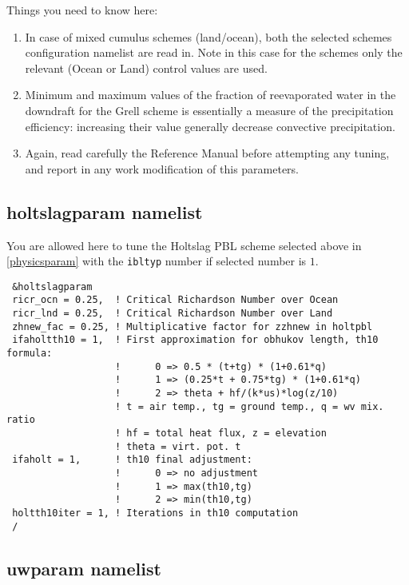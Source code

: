 Things you need to know here:

\begin{enumerate}
\item In case of mixed cumulus schemes (land/ocean), both the selected
schemes configuration namelist are read in.  Note in this case for the
schemes only the relevant (Ocean or Land) control values are used.
\item Minimum and maximum values of the fraction of reevaporated water in the
downdraft for the Grell scheme is essentially a measure of the precipitation
efficiency: increasing their value generally decrease convective precipitation.
\item Again, read carefully the Reference Manual before attempting any tuning,
and report in any work modification of this parameters.
\end{enumerate}

\subsection{holtslagparam namelist}

You are allowed here to tune the Holtslag PBL scheme selected above in
\ref{physicsparam} with the \verb=ibltyp= number if selected number is
$1$. 

{\footnotesize
\begin{Verbatim}
 &holtslagparam
 ricr_ocn = 0.25,  ! Critical Richardson Number over Ocean
 ricr_lnd = 0.25,  ! Critical Richardson Number over Land
 zhnew_fac = 0.25, ! Multiplicative factor for zzhnew in holtpbl
 ifaholtth10 = 1,  ! First approximation for obhukov length, th10 formula:
                   !      0 => 0.5 * (t+tg) * (1+0.61*q)
                   !      1 => (0.25*t + 0.75*tg) * (1+0.61*q)
                   !      2 => theta + hf/(k*us)*log(z/10)
                   ! t = air temp., tg = ground temp., q = wv mix. ratio
                   ! hf = total heat flux, z = elevation
                   ! theta = virt. pot. t
 ifaholt = 1,      ! th10 final adjustment:
                   !      0 => no adjustment
                   !      1 => max(th10,tg)
                   !      2 => min(th10,tg)
 holtth10iter = 1, ! Iterations in th10 computation
 /
\end{Verbatim}
}

\subsection{uwparam namelist}

